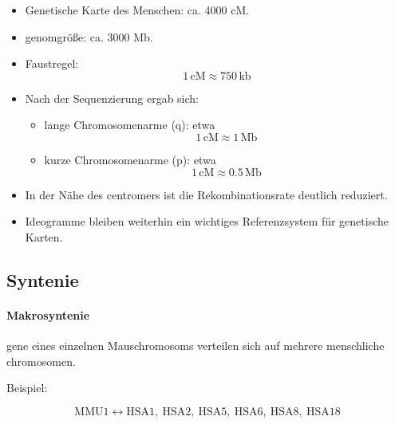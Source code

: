 \begin{itemize}
    \item Genetische Karte des Menschen:
    ca.
    4000 cM.

    \item \gls{genom}größe:
    ca.
    3000 Mb.

    \item Faustregel:
    \[
        1\,\mathrm{cM}
        \approx
        750\,\mathrm{kb}
    \]

    \item Nach der Sequenzierung ergab sich:

    \begin{itemize}
        \item lange Chromosomenarme (q):
        etwa
        \[
            1\,\mathrm{cM}
            \approx
            1\,\mathrm{Mb}
        \]

        \item kurze Chromosomenarme (p):
        etwa
        \[
            1\,\mathrm{cM}
            \approx
            0.5\,\mathrm{Mb}
        \]
    \end{itemize}

    \item In der Nähe des \gls{centromer}s ist die
    Rekombinationsrate deutlich reduziert.

    \item Ideogramme bleiben weiterhin ein wichtiges
    Referenzsystem für genetische Karten.
\end{itemize}



\subsection*{Syntenie}\label{subsec:syntenie}

\paragraph{Makrosyntenie}

\gls{gen}e eines einzelnen Mauschromosoms verteilen sich
auf mehrere menschliche \gls{chromosom}en.

Beispiel:

\[
    \mathrm{MMU1}
    \longleftrightarrow
    \mathrm{HSA1,\ HSA2,\ HSA5,\ HSA6,\ HSA8,\ HSA18}
\]

